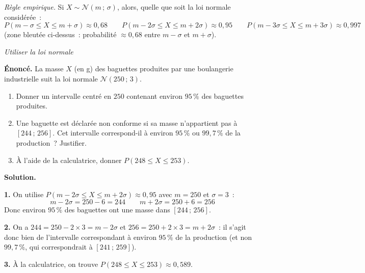 \documentclass[11pt,a4paper]{article}
\begin{document}
\begin{propriete}
\textit{Règle empirique.} Si $X \sim \mathcal{N}(m\,;\,\sigma)$, alors, quelle que soit la loi normale considérée~:
$$P(m-\sigma \leqslant X \leqslant m+\sigma) \approx 0{,}68 \qquad P(m-2\sigma \leqslant X \leqslant m+2\sigma) \approx 0{,}95 \qquad P(m-3\sigma \leqslant X \leqslant m+3\sigma) \approx 0{,}997$$
(zone bleutée ci-dessus~: probabilité $\approx 0{,}68$ entre $m-\sigma$ et $m+\sigma$).
\end{propriete}


\begin{exo}
\textit{Utiliser la loi normale}
\medskip

\textbf{Énoncé.} La masse $X$ (en g) des baguettes produites par une boulangerie industrielle suit la loi normale $\mathcal{N}(250\,;\,3)$.
\begin{enumerate}[leftmargin=6mm]
\item Donner un intervalle centré en $250$ contenant environ $95\,\%$ des baguettes produites.
\item Une baguette est déclarée non conforme si sa masse n'appartient pas à $[244\,;\,256]$. Cet intervalle correspond-il à environ $95\,\%$ ou $99{,}7\,\%$ de la production~? Justifier.
\item À l'aide de la calculatrice, donner $P(248 \leqslant X \leqslant 253)$.
\end{enumerate}

\textbf{Solution.}

\textbf{1.} On utilise $P(m-2\sigma \leqslant X \leqslant m+2\sigma) \approx 0{,}95$ avec $m=250$ et $\sigma=3$~:
$$m-2\sigma = 250-6 = 244 \qquad m+2\sigma = 250+6 = 256$$
Donc environ $95\,\%$ des baguettes ont une masse dans $[244\,;\,256]$.

\textbf{2.} On a $244 = 250-2\times3 = m-2\sigma$ et $256 = 250+2\times3 = m+2\sigma$~: il s'agit donc bien de l'intervalle correspondant à environ $95\,\%$ de la production (et non $99{,}7\,\%$, qui correspondrait à $[241\,;\,259]$).

\textbf{3.} À la calculatrice, on trouve $P(248 \leqslant X \leqslant 253) \approx 0{,}589$.
\end{exo}
\end{document}
